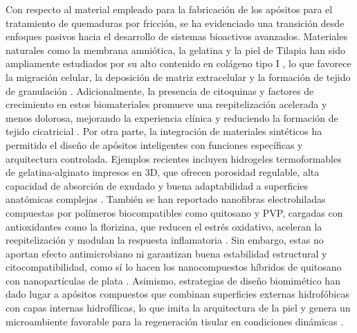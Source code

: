 \documentclass[../../DocumentoCompleto.tex]{subfiles}
\begin{document}
Con respecto al material empleado para la fabricación de los apósitos para el tratamiento de quemaduras por fricción, se ha evidenciado una transición desde enfoques pasivos hacia el desarrollo de sistemas bioactivos avanzados. Materiales naturales como la membrana amniótica, la gelatina y la piel de Tilapia han sido ampliamente estudiados por su alto contenido en colágeno tipo I \cite{Gaviria2018,Arauz2022}, lo que favorece la migración celular, la deposición de matriz extracelular y la formación de tejido de granulación \cite{Wang2025}. Adicionalmente, la presencia de citoquinas y factores de crecimiento en estos biomateriales promueve una reepitelización acelerada y menos dolorosa, mejorando la experiencia clínica y reduciendo la formación de tejido cicatricial \cite{Singh2011}. Por otra parte, la integración de materiales sintéticos ha permitido el diseño de apósitos inteligentes con funciones específicas y arquitectura controlada. Ejemplos recientes incluyen hidrogeles termoformables de gelatina-alginato impresos en 3D, que ofrecen porosidad regulable, alta capacidad de absorción de exudado y buena adaptabilidad a superficies anatómicas complejas \cite{Li2022}. También se han reportado nanofibras electrohiladas compuestas por polímeros biocompatibles como quitosano y PVP, cargadas con antioxidantes como la florizina, que reducen el estrés oxidativo, aceleran la reepitelización y modulan la respuesta inflamatoria \cite{Zhang2022}. Sin embargo, estas no aportan efecto antimicrobiano ni garantizan buena estabilidad estructural y citocompatibilidad, como sí lo hacen los nanocompuestos híbridos de quitosano con nanopartículas de plata \cite{Islam2023}. Asimismo, estrategias de diseño biomimético han dado lugar a apósitos compuestos que combinan superficies externas hidrofóbicas con capas internas hidrofílicas, lo que imita la arquitectura de la piel y genera un microambiente favorable para la regeneración tisular en condiciones dinámicas \cite{Wang2023,Chen2024}.
\end{document}

